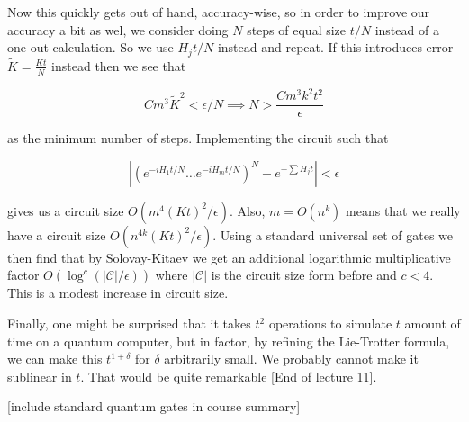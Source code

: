 \documentclass{article}
\theoremstyle{definition}
\begin{document}
Now this quickly gets out of hand, accuracy-wise, so in order to improve our
accuracy a bit as wel, we consider doing $N$ steps of equal size $t/N$ instead
of a one out calculation. So we use $H_j t / N$ instead and repeat. If this
introduces error $\tilde{K} = \frac{Kt}{N}$ instead then we see that

$$ Cm^3 \tilde{K}^2 < \epsilon / N \implies N > \frac{C m^3 k^2
  t^2}{\epsilon} $$

as the minimum number of steps. Implementing the circuit such that

$$ \left| \left( e^{-iH_1 t / N} \dots e^{-iH_m t / N} \right)^N - e^{-\sum H_j
    t} \right| < \epsilon $$

gives us a circuit size $O(m^4 (Kt)^2 / \epsilon)$. Also, $m = O(n^k)$ means
that we really have a circuit size $O(n^{4k} (Kt)^2 / \epsilon)$. Using a
standard universal set of gates we then find that by Solovay-Kitaev we get an
additional logarithmic multiplicative factor $O(\log^c(|\mathcal{C}| /
\epsilon))$ where $|\mathcal{C}|$ is the circuit size form before and $c < 4$.
This is a modest increase in circuit size.

Finally, one might be surprised that it takes $t^2$ operations to simulate $t$
amount of time on a quantum computer, but in factor, by refining the Lie-Trotter
formula, we can make this $t^{1 + \delta}$ for $\delta$ arbitrarily small. We
probably cannot make it sublinear in $t$. That would be quite remarkable [End of
lecture 11]. 

[include standard quantum gates in course summary]
\end{document}
